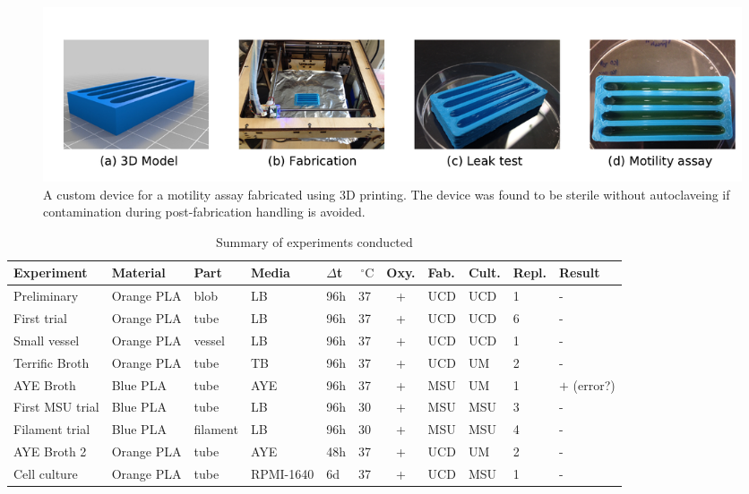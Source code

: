 \begin{refsection}
\begin{figure}
    \includegraphics[width=1.0\textwidth]{sterility/figures/Fig4}

    \caption{A custom device for a motility assay fabricated using 3D 
    printing. The device was found to be sterile without autoclaveing 
    if contamination during post-fabrication handling is avoided.}
    
    \label{fig:swim_plate}
\end{figure}

\begin{table}
\centering \tiny
\caption{Summary of experiments conducted}
\label{summary_table}
\begin{tabular}{@{}p{8em}p{7em}p{3em}p{2em}p{2em}p{1em}cp{2em}p{2em}p{3em}p{8em}@{}}
\toprule
Experiment & Material & Part & Media & $\Delta$t & $\,^{\circ}\mathrm{C}$ & \multicolumn{1}{l}{Oxy.} & Fab. & Cult. & \multicolumn{1}{l}{Repl.} & Result \\ \hline
Preliminary \cite{tweet_conjecture, tweet_first_result_1, tweet_first_result_2} & Orange PLA & blob & LB & 96h & 37 & + & UCD & UCD & 1 & - \\
First trial \cite{tweet_2nd_test, tweet_2nd_result} & Orange PLA & tube & LB & 96h & 37 & + & UCD & UCD & 6 & - \\
Small vessel \cite{tweet_mini_flask} & Orange PLA & vessel & LB & 96h & 37 & + & UCD & UCD & 1 & - \\
Terrific Broth \cite{tweet_terrific_aye, tweet_aye_96h} & Orange PLA & tube & TB & 96h & 37 & + & UCD & UM & 2 & - \\
AYE Broth \cite{tweet_aye_96h} & Blue PLA & tube & AYE & 96h & 37 & + & MSU & UM & 1 & $+$ (error?) \\
First MSU trial \cite{tweet_luis_24h, tweet_luis_48h} & Blue PLA & tube & LB & 96h & 30 & + & MSU & MSU & 3 & - \\
Filament trial \cite{tweet_filament_interior} & Blue PLA & filament & LB & 96h & 30 & + & MSU & MSU & 4 & - \\
AYE Broth 2 \cite{tweet_aye_2nd_test} & Orange PLA & tube & AYE & 48h & 37 & + & UCD & UM & 2 & - \\
Cell culture & Orange PLA & tube & RPMI-1640 & 6d & 37 & + & UCD & MSU & 1 & - \\

\end{tabular}
\end{table}
\end{refsection}

